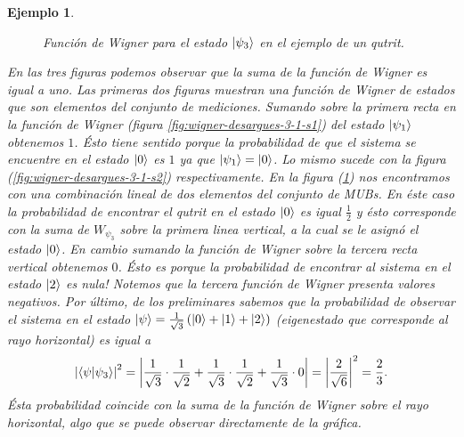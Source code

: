 \documentclass[a4paper]{report}
\newtheorem{example}{Ejemplo}
\begin{document}
\begin{example}
    \begin{figure}[ht]
      \centering
      \scalebox{0.7}{
        
      }
      \caption{Función de Wigner para el estado
        $\ket{\psi_3}$ en el ejemplo de un qutrit.}
      \label{fig:wigner-desargues-3-1-s3}
    \end{figure}

    En las tres figuras podemos observar que la suma de la
    función de Wigner es igual a uno. Las primeras dos
    figuras muestran una función de Wigner de estados que
    son elementos del conjunto de mediciones. Sumando sobre
    la primera recta en la función de Wigner (figura
    \ref{fig:wigner-desargues-3-1-s1}) del estado
    $\ket{\psi_1}$ obtenemos $1$. Ésto tiene sentido porque
    la probabilidad de que el sistema se encuentre en el
    estado $\ket 0$ es $1$ ya que $\ket{\psi_1} = \ket 0$.
    Lo mismo sucede con la figura
    (\ref{fig:wigner-desargues-3-1-s2}) respectivamente. En
    la figura (\ref{fig:wigner-desargues-3-1-s3}) nos
    encontramos con una combinación lineal de dos elementos
    del conjunto de MUBs. En éste caso la probabilidad de
    encontrar el qutrit en el estado $\ket 0$ es igual
    $\frac{1}{2}$ y ésto corresponde con la suma de
    $W_{\psi_3}$ sobre la primera linea vertical, a la cual
    se le asignó el estado $\ket 0$. En cambio sumando la
    función de Wigner sobre la tercera recta vertical
    obtenemos $0$. Ésto es porque la probabilidad de
    encontrar al sistema en el estado $\ket 2$ es nula!
    Notemos que la tercera función de Wigner presenta
    valores negativos. Por último, de los preliminares
    sabemos que la probabilidad de
    observar el sistema en el estado $\ket \psi =
    \frac{1}{\sqrt{3}}\left( \ket 0 + \ket 1 + \ket 2
    \right)$ (eigenestado que corresponde al rayo
    horizontal) es igual a
    \[
      \left|\braket{\psi|\psi_3}\right|^2
      = \left|
      \frac{1}{\sqrt{3}} \cdot \frac{1}{\sqrt{2}} +
      \frac{1}{\sqrt{3}} \cdot \frac{1}{\sqrt{2}} +
      \frac{1}{\sqrt{3}} \cdot 0
      \right|
      = \left|\frac{2}{\sqrt{6}}\right|^2
      = \frac{2}{3}.
    \] 
    Ésta probabilidad coincide con la suma de la función de
    Wigner sobre el rayo horizontal, algo que se puede
    observar directamente de la gráfica.
  \end{example}
\end{document}

